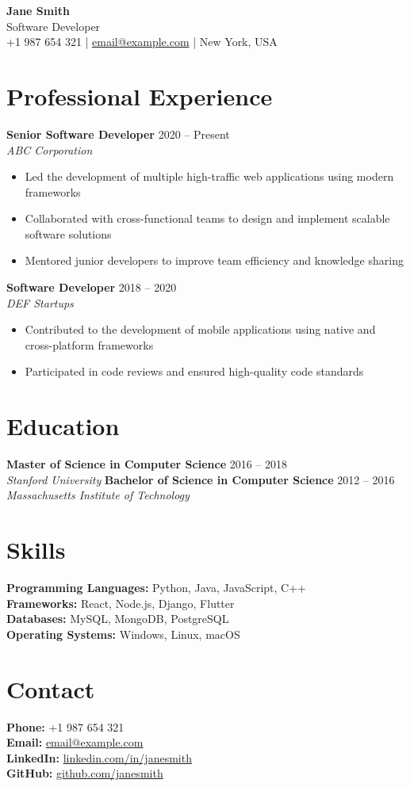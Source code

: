 \documentclass[11pt,a4paper]{article}
\begin{document}
\begin{center}
    {\Huge\textbf{Jane Smith}}\\[0.4cm]
    {\large Software Developer}\\[0.3cm]
    +1 987 654 321 | \href{mailto:email@example.com}{email@example.com} | New York, USA
\end{center}

\section{Professional Experience}
\textbf{Senior Software Developer} \hfill 2020 -- Present\\
\textit{ABC Corporation}
\begin{itemize}[noitemsep, topsep=3pt]
    \item Led the development of multiple high-traffic web applications using modern frameworks
    \item Collaborated with cross-functional teams to design and implement scalable software solutions
    \item Mentored junior developers to improve team efficiency and knowledge sharing
\end{itemize}
\textbf{Software Developer} \hfill 2018 -- 2020\\
\textit{DEF Startups}
\begin{itemize}[noitemsep, topsep=3pt]
    \item Contributed to the development of mobile applications using native and cross-platform frameworks
    \item Participated in code reviews and ensured high-quality code standards
\end{itemize}

\section{Education}
\textbf{Master of Science in Computer Science} \hfill 2016 -- 2018\\
\textit{Stanford University}
\textbf{Bachelor of Science in Computer Science} \hfill 2012 -- 2016\\
\textit{Massachusetts Institute of Technology}

\section{Skills}
\textbf{Programming Languages:} Python, Java, JavaScript, C++\\
\textbf{Frameworks:} React, Node.js, Django, Flutter\\
\textbf{Databases:} MySQL, MongoDB, PostgreSQL\\
\textbf{Operating Systems:} Windows, Linux, macOS

\section{Contact}
\textbf{Phone:} +1 987 654 321\\
\textbf{Email:} \href{mailto:email@example.com}{email@example.com}\\
\textbf{LinkedIn:} \href{https://www.linkedin.com/in/janesmith}{linkedin.com/in/janesmith}\\
\textbf{GitHub:} \href{https://github.com/janesmith}{github.com/janesmith}
\end{document}
